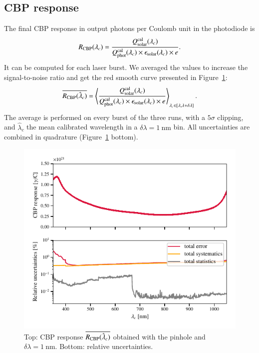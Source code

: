 \subsection{CBP response}

The final CBP response in output photons per Coulomb unit in the photodiode is
\begin{equation}
    R_{\mathrm{CBP}}(\lambda_c) = \frac{Q_{\mathrm{solar}}^{\mathrm{cal}}(\lambda_c)}{Q_{\mathrm{phot}}^{\mathrm{cal}}(\lambda_c) \times \epsilon_{\mathrm{solar}}(\lambda_c) \times e}.
    \label{eq:rcbp2}
\end{equation} 
It can be computed for each laser burst. We averaged the values to increase the signal-to-noise ratio and get the red smooth curve presented in Figure~\ref{fig:cbp_response}:
\begin{equation}
    \overline{R_{\mathrm{CBP}}(\hat{\lambda}_c)} = \left\langle\frac{Q_{\mathrm{solar}}^{\mathrm{cal}}(\lambda_c)}{Q_{\mathrm{phot}}^{\mathrm{cal}}(\lambda_c) \times \epsilon_{\mathrm{solar}}(\lambda_c) \times e}\right\rangle_{\lambda_c\in [\lambda,\lambda+\delta \lambda]}.
    \label{eq:rcbp3}
\end{equation} 
The average is performed on every burst of the three runs, with a $5\sigma$ clipping, and $\hat{\lambda}_c$ the mean calibrated wavelength in a $\delta \lambda = \SI{1}{\nano\meter}$ bin. All uncertainties are combined in quadrature (Figure~\ref{fig:cbp_response} bottom).



\begin{figure}[h]
    \centering
    \includegraphics[width=\columnwidth]{fig/cbp_response.pdf}
    \caption{Top: CBP response $\overline{R_{\mathrm{CBP}}(\hat{\lambda}_c)}$ obtained with the \bpinhole{} pinhole and $\delta \lambda = \SI{1}{\nano\meter}$. Bottom: relative uncertainties.}
    \label{fig:cbp_response}
\end{figure}
